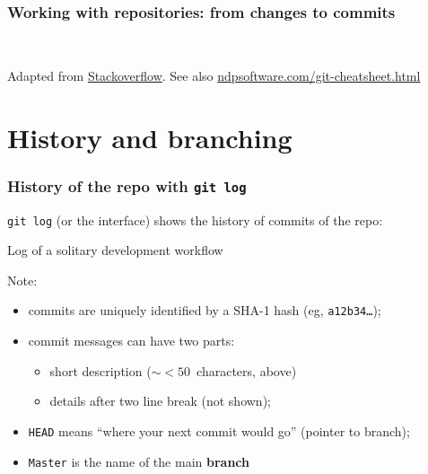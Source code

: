 \documentclass[10pt,svgnames,handout]{beamer}
\begin{document}
\begin{frame}
\frametitle{Working with repositories: from changes to commits}
\\
\begin{small}
Adapted from \href{https://tex.stackexchange.com/a/70332/14260}{Stackoverflow}. See also \href{http://ndpsoftware.com/git-cheatsheet.html}{ndpsoftware.com/git-cheatsheet.html}
\end{small}

\end{frame}



\section{History and branching}

\begin{frame}
\frametitle{History of the repo with \lstinline{git log}}

\lstinline{git log} (or the interface) shows the history of commits of the repo: \pause

\begin{block}{Log of a solitary development workflow}

\end{block}
\smallskip
\pause
Note:
\begin{itemize}
  \item commits are uniquely identified by a SHA-1 hash (eg, \texttt{a12b34\ldots});
  \item commit messages can have two parts:
  \begin{itemize}
    \item short description ($\sim<50$~characters, above)
    \item details after two line break (not shown);
  \end{itemize}
  \item \lstinline{HEAD} means “where your next commit would go” (pointer to branch);
  \item \lstinline{Master} is the name of the main \textbf{branch}
\end{itemize}
\end{frame}
\end{document}
